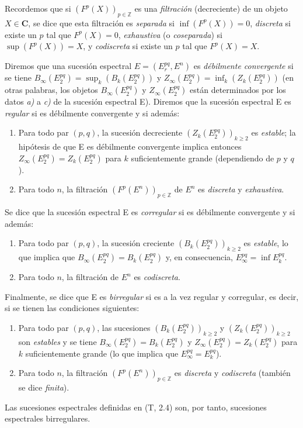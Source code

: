 \begin{env}[11.1.3]
\label{0.11.1.3}
\label{0.11.1.3-fr}
Recordemos que si $(F^p(X))_{p\in\mathbb Z}$ es una \emph{filtración} (decreciente) de un objeto $X\in\boldsymbol{C}$, se dice que esta filtración es \emph{separada} si $\inf(F^p(X))=0$, \emph{discreta} si existe un $p$ tal que $F^p(X)=0$, \emph{exhaustiva} (o \emph{coseparada}) si $\sup(F^p(X))=X$, y \emph{codiscreta} si existe un $p$ tal que $F^p(X)=X$.

Diremos que una sucesión espectral $E=(E_r^{pq},E^n)$ es \emph{débilmente convergente} si se tiene $B_\infty(E_2^{pq})=\sup_k(B_k(E_2^{pq}))$ y $Z_\infty(E_2^{pq})=\inf_k(Z_k(E_2^{pq}))$ (en otras palabras, los objetos $B_\infty(E_2^{pq})$ y $Z_\infty(E_2^{pq})$ están determinados por los datos \emph{a)} a \emph{c)} de la sucesión espectral E). Diremos que la sucesión espectral E es \emph{regular} si es débilmente convergente y si además:
\begin{enumerate}
  \item[$1^\circ$] Para todo par $(p,q)$, la sucesión decreciente $(Z_k(E_2^{pq}))_{k\geq2}$ es \emph{estable}; la hipótesis de que E es débilmente convergente implica entonces
$Z_\infty(E_2^{pq})=Z_k(E_2^{pq})$ para $k$ suficientemente grande (dependiendo de $p$ y $q$).
  \item[$2^\circ$] Para todo $n$, la filtración $(F^p(E^n))_{p\in\mathbb Z}$ de $E^n$ es \emph{discreta} y \emph{exhaustiva}.
\end{enumerate}

Se dice que la sucesión espectral E es \emph{corregular} si es débilmente convergente y si además:
\begin{enumerate}
  \item[$3^\circ$] Para todo par $(p,q)$, la sucesión creciente $(B_k(E_2^{pq}))_{k\geq2}$ es \emph{estable}, lo que implica que $B_\infty(E_2^{pq})=B_k(E_2^{pq})$ y, en consecuencia, $E_\infty^{pq}=\inf E_k^{pq}$.
  \item[$4^\circ$] Para todo $n$, la filtración de $E^n$ es \emph{codiscreta}.
\end{enumerate}

Finalmente, se dice que E es \emph{birregular} si es a la vez regular y corregular, es decir, si se tienen las condiciones siguientes:
\begin{enumerate}
  \item[\textit{a)}] Para todo par $(p,q)$, las sucesiones $(B_k(E_2^{pq}))_{k\geq2}$ y $(Z_k(E_2^{pq}))_{k\geq2}$ son \emph{estables} y se tiene $B_\infty(E_2^{pq})=B_k(E_2^{pq})$ y $Z_\infty(E_2^{pq})=Z_k(E_2^{pq})$ para $k$ suficientemente grande (lo que implica que $E_\infty^{pq}=E_k^{pq}$).
  \item[\textit{(b)}] Para todo $n$, la filtración $(F^p(E^n))_{p\in\mathbb Z}$ es \emph{discreta} y \emph{codiscreta} (también se dice \emph{finita}).
\end{enumerate}

Las sucesiones espectrales definidas en (T, 2.4) son, por tanto, sucesiones espectrales birregulares.
\end{env}


